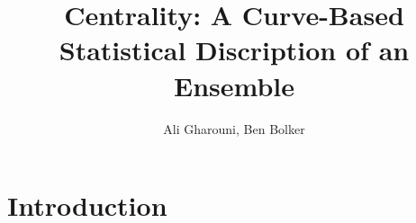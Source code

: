 \documentclass[12pt]{article}
\title{Centrality: A Curve-Based Statistical Discription of an Ensemble}
\author{Ali Gharouni, Ben Bolker}
\newcommand{\comment}{\showcomment}
\newcommand{\showcomment}[3]{\textcolor{#1}{\textbf{[#2: }\textsl{#3}\textbf{]}}}
\newcommand{\ali}[1]{\comment{magenta}{Ali}{#1}}
\theoremstyle{definition} %
\begin{document}
\maketitle
\linenumbers

\section{Introduction}



\end{document}
